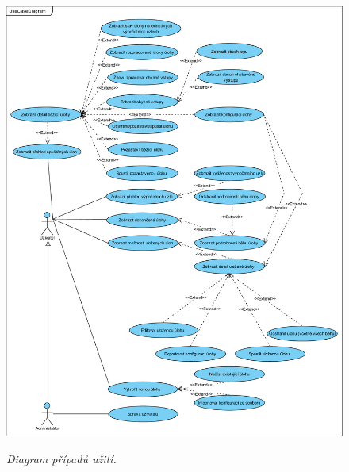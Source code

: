 \enlargethispage{3\baselineskip}
\begin{figure}[H]
\begin{center}
    \scalebox{0.5}
    {   
        \includegraphics{images/UseCaseDiagram.pdf}
    }
    \caption{\label{obr:useCaseDiagram} {\it Diagram případů užití.}}
\end{center}
\end{figure}

